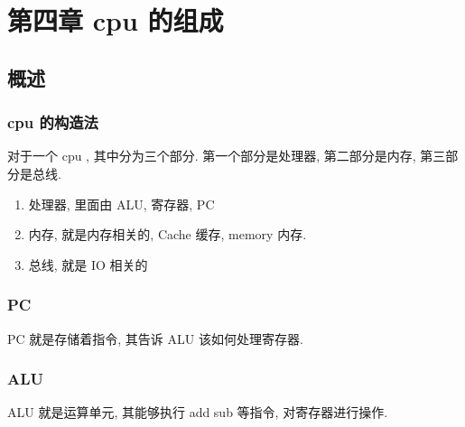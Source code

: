 \documentclass[11pt]{ctexart}
\date{\today}
\title{}
\begin{document}
\tableofcontents

\section{第四章 cpu 的组成}
\label{sec:orgaace655}
\subsection{概述}
\label{sec:orgaae309b}
\subsubsection{cpu 的构造法}
\label{sec:org4db401e}
对于一个 cpu , 其中分为三个部分. 第一个部分是处理器, 第二部分是内存,
第三部分是总线.  
\begin{enumerate}
\item 处理器, 里面由 ALU, 寄存器, PC
\item 内存, 就是内存相关的, Cache 缓存, memory 内存.
\item 总线, 就是 IO 相关的
\end{enumerate}
\subsubsection{PC}
\label{sec:org59764f9}
PC 就是存储着指令, 其告诉 ALU 该如何处理寄存器. 
\subsubsection{ALU}
\label{sec:org5edaf5c}
ALU 就是运算单元, 其能够执行 add sub 等指令, 对寄存器进行操作. 
\end{document}
